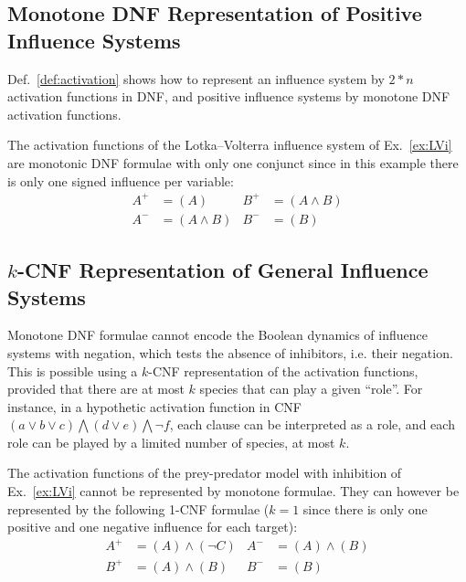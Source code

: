 \documentclass{llncs}
\begin{document}
\subsection{Monotone DNF Representation of Positive Influence Systems}

Def.~\ref{def:activation} shows how to represent an influence system by $2*n$ activation functions in DNF, 
and positive influence systems by monotone DNF activation functions.

\begin{example}
The activation functions of the Lotka--Volterra influence system of Ex.~\ref{ex:LVi}
are monotonic DNF formulae with only one conjunct since in this example there is only one signed influence per variable:
\begin{align*}
   A^+&=(A)& B^+&=(A\wedge B)\\
   A^-&=(A \wedge B)& B^-&=(B)
\end{align*}

\end{example}


\subsection{$k$-CNF Representation of General Influence Systems}
\label{sec:kcnf}

Monotone DNF formulae cannot encode the Boolean dynamics of influence systems with negation,
which tests the absence of inhibitors, i.e. their negation.
This is possible using a $k$-CNF representation of the activation functions,
provided that there are at most $k$ species that can play a given ``role''. 
For instance, in a hypothetic activation function in CNF
$
\left(a \vee b \vee c\right) \bigwedge
\left(d \vee e\right) \bigwedge 
\neg f
$,
each clause can be interpreted as a role, and each role can be played by a limited number of species, at most $k$.


\begin{example}
   The activation functions of the prey-predator model with inhibition of Ex.~\ref{ex:LVi} cannot be
   represented by monotone formulae. They can however be represented by the following 1-CNF
   formulae ($k=1$ since there is only one positive and one
   negative influence for each target):
\begin{align*}
   A^+&=(A)\wedge(\neg C)& A^-&=(A) \wedge (B)\\
   B^+&=(A)\wedge (B)& B^-&=(B)
\end{align*}

\end{example}
\end{document}
